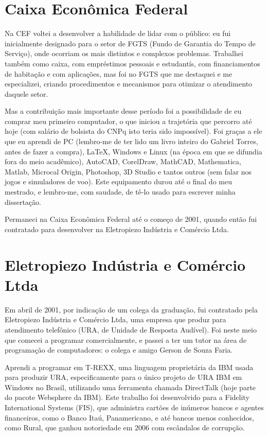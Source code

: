 \section{Caixa Econômica Federal}
\label{sec:cef}

Na CEF voltei a desenvolver a habilidade de lidar com o público: eu fui inicialmente designado para o setor de FGTS (Fundo de Garantia do Tempo de Serviço), onde ocorriam os mais distintos e complexos problemas. Trabalhei também como caixa, com empréstimos pessoais e estudantís, com financiamentos de habitação e com aplicações, mas foi no FGTS que me destaquei e me especializei, criando procedimentos e mecanismos para otimizar o atendimento daquele setor.

Mas a contribuição mais importante desse período foi a possibilidade de eu comprar meu primeiro computador, o que iniciou a trajetória que percorro até hoje (com salário de bolsista do CNPq isto teria sido impossível). Foi graças a ele que eu aprendi  de PC (lembro-me de ter lido um livro inteiro do Gabriel Torres, antes de fazer a compra), \LaTeX, Windows e Linux (na época em que se difundia fora do meio acadêmico), AutoCAD, CorelDraw, MathCAD, Mathematica, Matlab, Microcal Origin, Photoshop, 3D Studio e tantos outros (sem falar nos jogos e simuladores de voo). Este equipamento durou até o final do meu mestrado, e lembro-me, com saudade, de tê-lo usado para escrever minha dissertação.

Permaneci na Caixa Econômica Federal até o começo de 2001, quando então fui contratado para desenvolver  na Eletropiezo Indústria e Comércio Ltda.

\section{Eletropiezo Indústria e Comércio Ltda}
\label{sec:eletropiezo}

Em abril de 2001, por indicação de um colega da graduação, fui contratado pela Eletropiezo Indústria e Comércio Ltda, uma empresa que produz  para atendimento telefônico (URA, de Unidade de Resposta Audível). Foi neste meio que comecei a programar comercialmente, e passei a ter um tutor na área de programação de computadores: o colega e amigo Gerson de Souza Faria.

Aprendi a programar em T-REXX, uma linguagem proprietária da IBM usada para produzir URA, especificamente para o único projeto de URA IBM em Windows no Brasil, utilizando uma ferramenta chamada DirectTalk (hoje parte do pacote Websphere da IBM). Este trabalho foi desenvolvido para a Fidelity International Systems (FIS), que administra cartões de inúmeros bancos e agentes financeiros, como o Banco Itaú, Panamericano, e até bancos menos conhecidos, como Rural, que ganhou notoriedade em 2006 com escândalos de corrupção.


